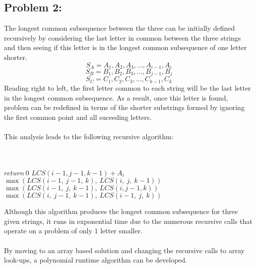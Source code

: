 \documentclass[12pt]{article}
\begin{document}
\subsection*{Problem 2:}
The longest common subsequence between the three can be
initially defined recursively by considering the last 
letter in common between the three strings and then 
seeing if this letter is in the longest common subsequence
of one letter shorter.
\[
S_A = A_1, A_2, A_3,\dots,A_{i-1},A_i
\]
\[
S_B = B_1, B_2, B_3,\dots,B_{j-1},B_j
\]
\[
S_C = C_1, C_2, C_3,\dots,C_{k-1},C_k
\]
Reading right to left, the first letter common to each string will
be the last letter in the longest common subsequence.  As a result,
once this letter is found, problem can be redefined in terms of the 
shorter substrings formed by ignoring the first common point and 
all suceeding letters.\\\\
This analysis leads to the following recursive algorithm:\\\\
\begin{algorithm}[H]
\\
{$return\ 0$}
{$LCS(i-1,j-1,k-1) + A_i$}
{$\max(LCS(i-1,\ j-1,\ k),\ LCS(i,\ j,\ k-1))$}
{$\max(LCS(i-1,\ j,\ k-1),\ LCS(i, j-1, k))$}
{$\max(LCS(i,\ j-1,\ k-1),\ LCS(i-1,\ j,\ k))$}
\end{algorithm}
Although this algorithm produces the longest common subsequence for
three given strings, it runs in exponential time due to the numerous
recursive calls that operate on a problem of only $1$ letter smaller.\\\\
By moving to an array based solution and changing the recursive calls 
to array look-ups, a polynomial runtime algorithm can be developed.\\\\
\end{document}

